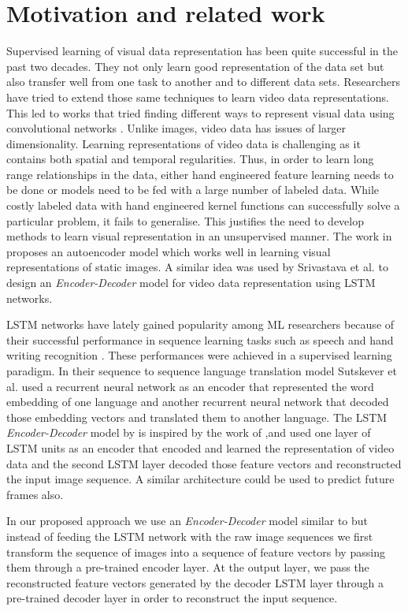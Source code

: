\documentclass[sigconf]{acmart}
\begin{document}
\section{Motivation and related work}
Supervised learning of visual data representation has been quite successful in the past two decades. They not only learn good representation of the data set but also transfer well from one task to another and to different data sets. Researchers have tried to extend those same techniques to learn video data representations. This led to works that tried finding different ways to represent visual data using convolutional networks \cite{simonyan}. Unlike images, video data has issues of larger dimensionality. Learning representations of video data is challenging as it contains both spatial and temporal regularities. Thus, in order to learn long range relationships in the data, either hand engineered feature learning needs to be done or models need to be fed with a large number of labeled data. While costly labeled data with hand engineered kernel functions can successfully solve a particular problem, it fails to generalise. This justifies the need to develop methods to learn visual representation in an unsupervised manner. The work in \cite{ranzanto} proposes an autoencoder model which works well in learning visual representations of static images. A similar idea was used by  Srivastava et al. \cite{srivastava} to design an \textit{Encoder-Decoder} model for video data representation using LSTM networks.

LSTM networks have lately gained popularity among ML researchers because of their successful performance in sequence learning tasks such as speech and hand writing recognition \cite{graves}. These performances were achieved in a supervised learning paradigm. In their sequence to sequence language translation model Sutskever et al. \cite{sutskever}  used a recurrent neural network as an encoder that represented the word embedding of one language and another recurrent neural network that decoded those embedding vectors and translated them to another language. The LSTM \textit{Encoder-Decoder} model by \cite{srivastava} is inspired by the work of \cite{sutskever},and used one layer of LSTM units  as an encoder that encoded and learned the representation of video data and the second LSTM layer decoded those feature vectors and reconstructed the input image sequence. A similar architecture could be used to predict future frames also.

In our proposed approach we use an \textit{Encoder-Decoder} model similar to \cite{srivastava} but instead of feeding the LSTM network with the raw image sequences we first transform the sequence of images into a sequence of feature vectors by passing them  through a pre-trained encoder layer. At the output layer, we pass the reconstructed feature vectors generated by the decoder LSTM layer through a pre-trained decoder layer in order to reconstruct the input sequence.
\end{document}
